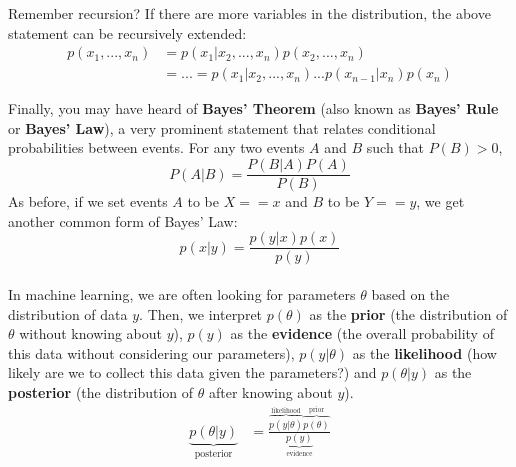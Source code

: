\documentclass[12pt,letterpaper]{article}
\newcommand{\E}{\mathbb{E}}
\newcommand{\var}{\mathrm{var}}
\begin{document}
\noindent Remember recursion? If there are more variables in the distribution, the above statement can be recursively extended:
\begin{align*}
p(x_1,...,x_n)&= p(x_1|x_2,...,x_n)p(x_2,...,x_n)\\
&= ... = p(x_1|x_2,...,x_n)...p(x_{n-1}|x_n)p(x_n)
\end{align*}

\noindent Finally, you may have heard of {\bf{Bayes' Theorem}} (also known as {\bf{Bayes' Rule}} or {\bf{Bayes' Law}}), a very prominent statement that relates conditional probabilities between events. For any two events $A$ and $B$ such that $P(B) > 0$,
$$ P(A | B) = \frac{P(B | A) P(A)}{P(B)} $$
As before, if we set events $A$ to be $X == x$ and $B$ to be $Y == y$, we get another common form of Bayes' Law:
$$ p(x | y) = \frac{p(y | x) p(x)}{p(y)} $$ \\
In machine learning, we are often looking for parameters $\theta$ based on the distribution of data $y$. Then, we interpret $p(\theta)$ as the {\bf{prior}} (the distribution of $\theta$ without knowing about $y$), $p(y)$ as the {\bf{evidence}} (the overall probability of this data without considering our parameters), $p( y | \theta)$ as the {\bf{likelihood}} (how likely are we to collect this data given the parameters?) and $p( \theta | y)$ as the {\bf{posterior}} (the distribution of $\theta$ after knowing about $y$).
\begin{align*}
\underbrace{p(\theta | y)}_{\text{posterior}}
&= \frac{\overbrace{ p(y | \theta) }^{\text{likelihood}} 
	\overbrace{ p(\theta) }^{\text{prior}}}
{\underbrace{p(y)}_{\text{evidence}}}
\end{align*}


\end{document}
